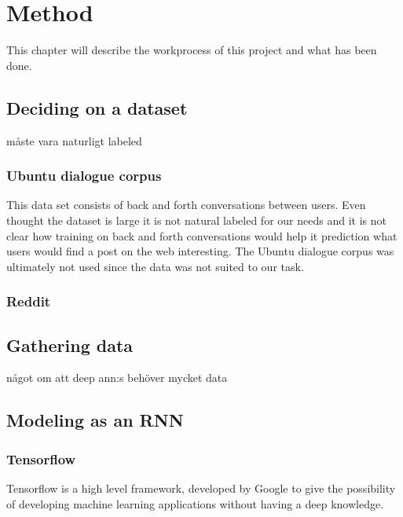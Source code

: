 \chapter{Method}%
This chapter will describe the workprocess of this project and what has been done.
\section{Deciding on a dataset}
måste vara naturligt labeled
\subsection{Ubuntu dialogue corpus}
This data set consists of back and forth conversations between users. Even thought the dataset is large it is not natural labeled for our needs and it is not clear how training on back and forth conversations would help it prediction what users would find a post on the web interesting. The Ubuntu dialogue corpus was ultimately not used since the data was not suited to our task.
\subsection{Reddit}
\section{Gathering data}
något om att deep ann:s behöver mycket data %
\section{Modeling as an RNN}
\subsection{Tensorflow}%
Tensorflow is a high level framework, developed by Google to give the possibility of developing machine learning applications without having a deep knowledge. %
\subsection{LSTM-network}
\subsection{Scaling down}
As by suggestion from our supervisor we will begin with a very small scale network, instead of having the number of users in the tens of thousands we will start with 2-5 users. The reasoning for this is it that it will now be easier to not just train the network but to also to analyse it. This is a common approach in machine learning (source Olof) and the hope is that whatever model works on the small scale will hopefully continue to perform when it is scaled up.    

